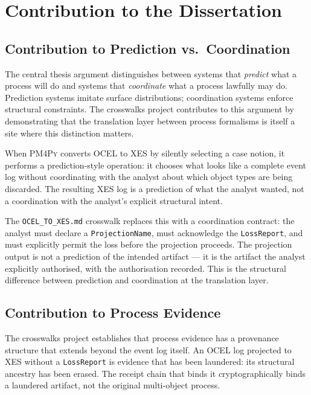 
\section{Contribution to the Dissertation}
\label{sec:crosswalks-contribution}

\subsection{Contribution to Prediction vs.~Coordination}
\label{sec:crosswalks-contribution-prediction}

The central thesis argument distinguishes between systems that \emph{predict} what a process will
do and systems that \emph{coordinate} what a process lawfully may do. Prediction systems imitate
surface distributions; coordination systems enforce structural constraints. The crosswalks project
contributes to this argument by demonstrating that the translation layer between process formalisms
is itself a site where this distinction matters.

When \textsc{PM4Py} converts \textsc{OCEL} to \textsc{XES} by silently selecting a case notion,
it performs a prediction-style operation: it chooses what looks like a complete event log without
coordinating with the analyst about which object types are being discarded. The resulting
\textsc{XES} log is a prediction of what the analyst wanted, not a coordination with the analyst's
explicit structural intent.

The \texttt{OCEL\_TO\_XES.md} crosswalk replaces this with a coordination contract: the analyst
must declare a \texttt{ProjectionName}, must acknowledge the \texttt{LossReport}, and must
explicitly permit the loss before the projection proceeds. The projection output is not a
prediction of the intended artifact --- it is the artifact the analyst explicitly authorised,
with the authorisation recorded. This is the structural difference between prediction and
coordination at the translation layer.

\subsection{Contribution to Process Evidence}
\label{sec:crosswalks-contribution-evidence}

The crosswalks project establishes that process evidence has a provenance structure that extends
beyond the event log itself. An \textsc{OCEL} log projected to \textsc{XES} without a
\texttt{LossReport} is evidence that has been laundered: its structural ancestry has been erased.
The receipt chain that binds it cryptographically binds a laundered artifact, not the original
multi-object process.

